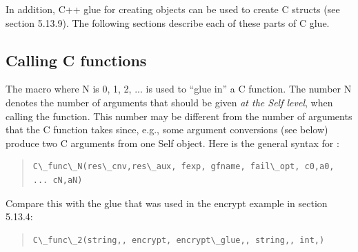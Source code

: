 \documentclass[letterpaper,10pt,english]{sphinxmanual}
\begin{document}
In addition, C++ glue for creating objects can be used to create C structs (see section 5.13.9). The
following sections describe each of these parts of C glue.


\subsection{Calling C functions}
\label{vmref:calling-c-functions}\label{vmref:index-71}
The macro  where N is 0, 1, 2, ... is used to “glue in” a C function. The number N denotes
the number of arguments that should be given \emph{at the Self level}, when calling the function. This
number may be different from the number of arguments that the C function takes since, e.g., some
argument conversions (see below) produce two C arguments from one Self object. Here is the
general syntax for :
\begin{quote}

\begin{Verbatim}[commandchars=\\\{\}]
C\_func\_N(res\_cnv,res\_aux, fexp, gfname, fail\_opt, c0,a0, ... cN,aN)
\end{Verbatim}
\end{quote}

Compare this with the glue that was used in the encrypt example in section 5.13.4:
\begin{quote}

\begin{Verbatim}[commandchars=\\\{\}]
C\_func\_2(string,, encrypt, encrypt\_glue,, string,, int,)
\end{Verbatim}
\end{quote}
\end{document}
